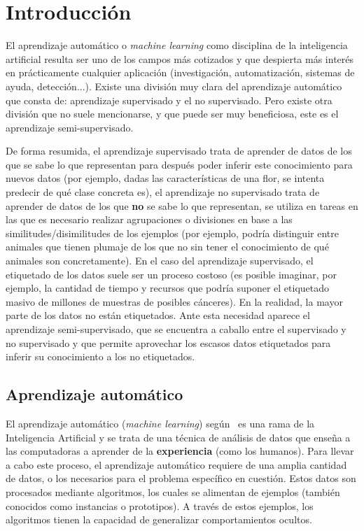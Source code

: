 
\cleardoublepage

\chapter{Introducción}
\label{introduccion}

El aprendizaje automático o \textit{machine learning} como disciplina de la inteligencia artificial resulta ser uno de los campos más cotizados y que despierta más interés en prácticamente cualquier aplicación (investigación, automatización, sistemas de ayuda, detección...). Existe una división muy clara del aprendizaje automático que consta de: aprendizaje supervisado y el no supervisado. Pero existe otra división que no suele mencionarse, y que puede ser muy beneficiosa, este es el aprendizaje semi-supervisado.

De forma resumida, el aprendizaje supervisado trata de aprender de datos de los que se sabe lo que representan para después poder inferir este conocimiento para nuevos datos (por ejemplo, dadas las características de una flor, se intenta predecir de qué clase concreta es), el aprendizaje no supervisado trata de aprender de datos de los que \textbf{no} se sabe lo que representan, se utiliza en tareas en las que es necesario realizar agrupaciones o divisiones en base a las similitudes/disimilitudes de los ejemplos (por ejemplo, podría distinguir entre animales que tienen plumaje de los que no sin tener el conocimiento de qué animales son concretamente). En el caso del aprendizaje supervisado, el etiquetado de los datos suele ser un proceso costoso (es posible imaginar, por ejemplo, la cantidad de tiempo y recursos que podría suponer el etiquetado masivo de millones de muestras de posibles cánceres). En la realidad, la mayor parte de los datos no están etiquetados. Ante esta necesidad aparece el aprendizaje semi-supervisado, que se encuentra a caballo entre el supervisado y no supervisado y que permite aprovechar los escasos datos etiquetados para inferir su conocimiento a los no etiquetados.

\section{Aprendizaje automático}

El aprendizaje automático (\textit{machine
learning}) según~\cite{intelligent:ml} es una rama de la Inteligencia Artificial y se trata de una técnica de análisis de datos que enseña a las computadoras a aprender de la \textbf{experiencia} (como los humanos). Para llevar a cabo este proceso, el aprendizaje automático requiere de una amplia cantidad de datos, o los necesarios para el problema específico en cuestión. Estos datos son procesados mediante algoritmos, los cuales se alimentan de ejemplos (también conocidos como instancias o prototipos). A través de estos ejemplos, los algoritmos tienen la capacidad de generalizar comportamientos ocultos.

